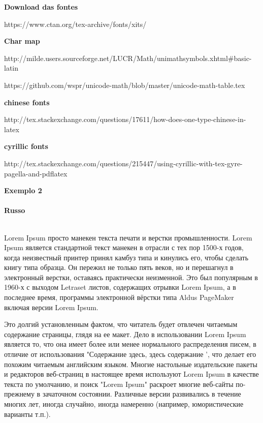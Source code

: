 \documentclass{article}
\begin{document}
\par \textbf{Download das fontes}
\par https://www.ctan.org/tex-archive/fonts/xits/
\par

\par \textbf{Char map}
\par http://milde.users.sourceforge.net/LUCR/Math/unimathsymbols.xhtml#basic-latin
\par https://github.com/wspr/unicode-math/blob/master/unicode-math-table.tex

\par \textbf{chinese fonts}
\par http://tex.stackexchange.com/questions/17611/how-does-one-type-chinese-in-latex

\par \textbf{cyrillic fonts}
\par http://tex.stackexchange.com/questions/215447/using-cyrillic-with-tex-gyre-pagella-and-pdflatex



\par

\textbf{\huge{}Exemplo 2}\\\\

\textbf{\huge{}Russo}\\\\

\par
Lorem Ipsum просто манекен текста печати и верстки промышленности. Lorem Ipsum является стандартной текст манекен в отрасли с тех пор 1500-х годов, когда неизвестный принтер принял камбуз типа и кинулись его, чтобы сделать книгу типа образца. Он пережил не только пять веков, но и перешагнул в электронный верстки, оставаясь практически неизменной. Это был популярным в 1960-х с выходом Letraset листов, содержащих отрывки Lorem Ipsum, а в последнее время, программы электронной вёрстки типа Aldus PageMaker включая версии Lorem Ipsum.

Это долгий установленным фактом, что читатель будет отвлечен читаемым содержание страницы, глядя на ее макет. Дело в использовании Lorem Ipsum является то, что она имеет более или менее нормального распределения писем, в отличие от использования "Содержание здесь, здесь содержание ', что делает его похожим читаемым английским языком. Многие настольные издательские пакеты и редакторов веб-страниц в настоящее время используют Lorem Ipsum в качестве текста по умолчанию, и поиск "Lorem Ipsum" раскроет многие веб-сайты по-прежнему в зачаточном состоянии. Различные версии развивались в течение многих лет, иногда случайно, иногда намеренно (например, юмористические варианты т.п.).
\end{document}
